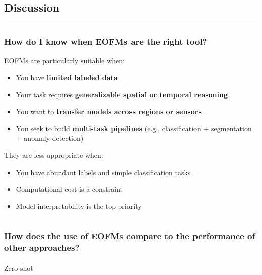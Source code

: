 \documentclass[
  letterpaper,
  DIV=11,
  numbers=noendperiod]{scrreprt}
\makeatletter
\let\oldparagraph\paragraph
\renewcommand{\paragraph}{
    \@ifstar
      \xxxParagraphStar
      \xxxParagraphNoStar
  }
\newcommand{\xxxParagraphStar}[1]{\oldparagraph*{#1}\mbox{}}
\newcommand{\xxxParagraphNoStar}[1]{\oldparagraph{#1}\mbox{}}
\providecommand{\tightlist}{%
  \setlength{\itemsep}{0pt}\setlength{\parskip}{0pt}}\usepackage{longtable,booktabs,array}
\makeatother
\begin{document}
\subsection{Discussion}\label{discussion}

\begin{center}\rule{0.5\linewidth}{0.5pt}\end{center}

\subsubsection{How do I know when EOFMs are the right
tool?}\label{how-do-i-know-when-eofms-are-the-right-tool}

EOFMs are particularly suitable when:

\begin{itemize}
\tightlist
\item
  You have \textbf{limited labeled data}
\item
  Your task requires \textbf{generalizable spatial or temporal
  reasoning}
\item
  You want to \textbf{transfer models across regions or sensors}
\item
  You seek to build \textbf{multi-task pipelines} (e.g., classification
  + segmentation + anomaly detection)
\end{itemize}

They are less appropriate when:

\begin{itemize}
\tightlist
\item
  You have abundant labels and simple classification tasks
\item
  Computational cost is a constraint
\item
  Model interpretability is the top priority
\end{itemize}

\begin{center}\rule{0.5\linewidth}{0.5pt}\end{center}

\subsubsection{How does the use of EOFMs compare to the performance of
other
approaches?}\label{how-does-the-use-of-eofms-compare-to-the-performance-of-other-approaches}

\paragraph{Zero-shot}\label{zero-shot}
\end{document}
